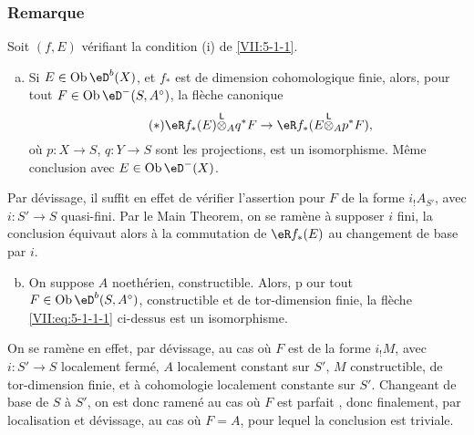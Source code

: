 \subsubsection{Remarque}\label{VII:5-1-2}

Soit $(f,E)$ v\'erifiant la condition (i) de \ref{VII:5-1-1}. 
\begin{enumerate}[a)]
  \item Si $E\in \ob \eD^b(X)$, et $f_\ast$ est de dimension cohomologique 
    finie, alors, pour tout $F\in \ob\eD^-(S,A^\circ)$, la fl\`eche canonique 
    \begin{equation*}\tag{$*$}\label{VII:eq:5-1-1-1}
      \eR f_\ast(E)\lotimes_A q^\ast F \to \eR f_\ast(E\lotimes_A p^\ast F) \text{,} 
    \end{equation*}
    o\`u $p:X\to S$, $q:Y\to S$ sont les projections, est un isomorphisme. 
    M\^eme conclusion avec $E\in\ob\eD^-(X)$. 
\end{enumerate} 

Par d\'evissage, il suffit en effet de v\'erifier l'assertion pour $F$ de la 
forme $i_! A_{S'}$, avec $i:S'\to S$ quasi-fini. Par le Main Theorem, on se 
ram\`ene \`a supposer $i$ fini, la conclusion \'equivaut alors \`a la 
commutation de $\eR f_\ast(E)$ au changement de base par $i$. 
\begin{enumerate}[a)]
\setcounter{enumi}{1}
  \item On suppose $A$ noeth\'erien, constructible. Alors, p our tout 
    $F\in\ob\eD^b(S,A^\circ)$, constructible et de tor-dimension finie, la 
    fl\`eche \eqref{VII:eq:5-1-1-1} ci-dessus est un isomorphisme. 
\end{enumerate}

On se ram\`ene en effet, par d\'evissage, au cas o\`u $F$ est de la forme 
$i_! M$, avec $i:S'\to S$ localement ferm\'e, $A$ localement constant sur $S'$, 
$M$ constructible, de tor-dimension finie, et \`a cohomologie localement 
constante sur $S'$. Changeant de base de $S$ \`a $S'$, on est donc ramen\'e au 
cas o\`u $F$ est parfait \cite[I]{sga6}, donc finalement, par localisation et 
d\'evissage, au cas o\`u $F=A$, pour lequel la conclusion est triviale. 





\subsubsection{}\label{VII:5-1-3}


